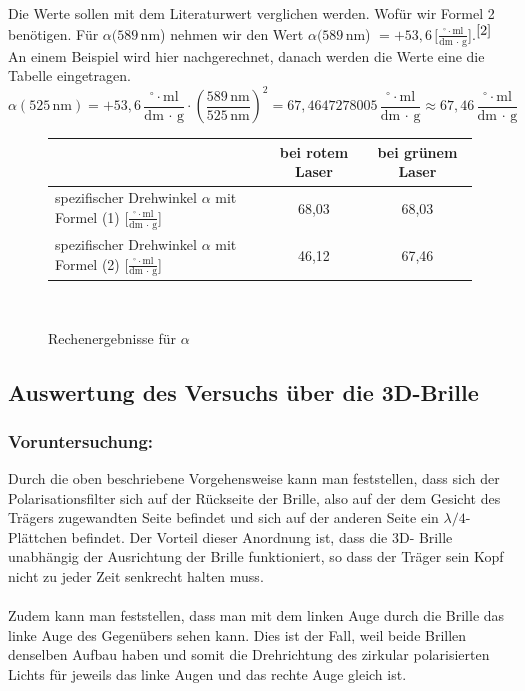 \documentclass[fontsize=12pt]{scrartcl}
\begin{document}
\newpage
\noindent
Die Werte sollen mit dem Literaturwert verglichen werden. Wofür wir Formel 2 benötigen. Für $\alpha(589$\,nm) nehmen wir den Wert
$\alpha(589$\,nm) $=+53,6\,[\frac{ ^\circ \cdot \text{ml}}{\text{dm $\cdot$ g}}$].$^{\cite{2}}$
An einem Beispiel wird hier nachgerechnet, danach werden die Werte eine die Tabelle eingetragen.
\begin{equation*}
\alpha(525\,\text{nm})=+53,6\,\frac{ ^\circ \cdot \text{ml}}{\text{dm $\cdot$ g}}\cdot (\frac{589\,\text{nm}}{525\,\text{nm}})^2=67,4647278005\,\frac{ ^\circ \cdot \text{ml}}{\text{dm $\cdot$ g}} \approx 67,46\,\frac{ ^\circ \cdot \text{ml}}{\text{dm $\cdot$ g}}
\end{equation*}
\begin{figure}[h]
\centering
\caption{Rechenergebnisse für $\alpha$}
\begin{tabular}{|l|c|c|} \hline
  & bei rotem Laser  & bei grünem Laser\\ \hline
spezifischer Drehwinkel $\alpha$ mit Formel (1) [$\frac{ ^\circ \cdot \text{ml}}{\text{dm $\cdot$ g}}$]  & 68,03  & 68,03  \\ \hline
spezifischer Drehwinkel $\alpha$ mit Formel (2) [$\frac{ ^\circ \cdot \text{ml}}{\text{dm $\cdot$ g}}$]  & 46,12  & 67,46  \\ \hline
\end{tabular} \\
\end{figure}
\newpage
\noindent
\subsection{Auswertung des Versuchs über die 3D-Brille }

\subsubsection{Voruntersuchung:}
Durch die oben beschriebene Vorgehensweise kann man feststellen, dass sich der Polarisationsfilter sich auf der Rückseite der Brille, also auf der dem Gesicht 
des Trägers zugewandten Seite befindet und sich auf der anderen Seite ein $\lambda/4$-Plättchen befindet. Der Vorteil dieser Anordnung ist, dass die 3D-
Brille unabhängig der Ausrichtung der Brille funktioniert, so dass der Träger sein Kopf nicht zu jeder Zeit senkrecht halten muss. \\
~\\
Zudem kann man feststellen, dass man mit dem linken Auge durch die Brille das linke Auge des Gegenübers sehen kann. Dies ist der Fall, weil beide Brillen denselben Aufbau haben und  somit die Drehrichtung des zirkular polarisierten Lichts für jeweils das linke Augen und das rechte Auge gleich ist.
\end{document}

